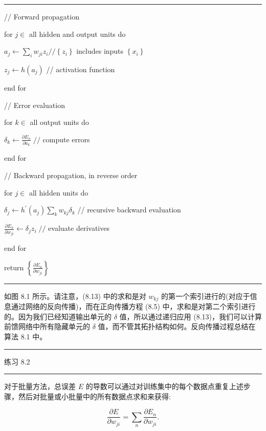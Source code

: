 \documentclass[10pt]{report}
\newcommand{\HRule}{\begin{center}\rule{0.9\linewidth}{0.2mm}\end{center}}
\begin{document}
\HRule

// Forward propagation

for \(j \in\) all hidden and output units do

\hspace*{1em} \({a}_{j} \leftarrow  \mathop{\sum }\limits_{i}{w}_{ji}{z}_{i}//\left\{  {z}_{i}\right\}\) includes inputs \(\left\{  {x}_{i}\right\}\)

\hspace*{1em} \({z}_{j} \leftarrow  h\left( {a}_{j}\right)\) // activation function

end for

// Error evaluation

for \(k \in\) all output units do

\hspace*{1em} \({\delta }_{k} \leftarrow  \frac{\partial {E}_{n}}{\partial {a}_{k}}\;//\) compute errors

end for

// Backward propagation, in reverse order

for \(j \in\) all hidden units do

\hspace*{1em} \({\delta }_{j} \leftarrow  {h}^{\prime }\left( {a}_{j}\right) \mathop{\sum }\limits_{k}{w}_{kj}{\delta }_{k}\) // recursive backward evaluation

\hspace*{1em} \(\frac{\partial {E}_{n}}{\partial {w}_{ji}} \leftarrow  {\delta }_{j}{z}_{i}\;//\) evaluate derivatives

end for

return \(\left\{  \frac{\partial {E}_{n}}{\partial {w}_{ji}}\right\}\)

\HRule

如图 8.1 所示。请注意，(8.13) 中的求和是对 \({w}_{kj}\) 的第一个索引进行的(对应于信息通过网络的反向传播)，而在正向传播方程 (8.5) 中，求和是对第二个索引进行的。因为我们已经知道输出单元的 \(\delta\) 值，所以通过递归应用 (8.13)，我们可以计算前馈网络中所有隐藏单元的 \(\delta\) 值，而不管其拓扑结构如何。反向传播过程总结在算法 8.1 中。

\HRule

练习 8.2

\HRule

对于批量方法，总误差 \(E\) 的导数可以通过对训练集中的每个数据点重复上述步骤，然后对批量或小批量中的所有数据点求和来获得:

\[
\frac{\partial E}{\partial {w}_{ji}} = \mathop{\sum }\limits_{n}\frac{\partial {E}_{n}}{\partial {w}_{ji}}. \tag{8.14}
\]
\end{document}

